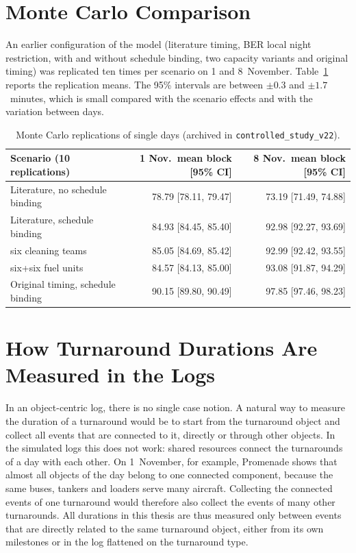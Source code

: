 \section{Monte Carlo Comparison}

An earlier configuration of the model (literature timing, BER local night restriction, with and without schedule binding, two capacity variants and original timing) was replicated ten times per scenario on 1 and 8~November. Table~\ref{tab:mc} reports the replication means. The 95\% intervals are between $\pm0.3$ and $\pm1.7$~minutes, which is small compared with the scenario effects and with the variation between days.

\begin{table}[htbp]\centering\small
\begin{tabular}{lrr}\hline
Scenario (10 replications) & 1 Nov.\ mean block [95\% CI] & 8 Nov.\ mean block [95\% CI]\\\hline
Literature, no schedule binding & 78.79 [78.11, 79.47] & 73.19 [71.49, 74.88]\\
Literature, schedule binding & 84.93 [84.45, 85.40] & 92.98 [92.27, 93.69]\\
\quad six cleaning teams & 85.05 [84.69, 85.42] & 92.99 [92.42, 93.55]\\
\quad six+six fuel units & 84.57 [84.13, 85.00] & 93.08 [91.87, 94.29]\\
Original timing, schedule binding & 90.15 [89.80, 90.49] & 97.85 [97.46, 98.23]\\\hline
\end{tabular}
\caption{Monte Carlo replications of single days (archived in \texttt{controlled\_study\_v22}).}
\label{tab:mc}
\end{table}

\section{How Turnaround Durations Are Measured in the Logs}

In an object-centric log, there is no single case notion. A natural way to measure the duration of a turnaround would be to start from the turnaround object and collect all events that are connected to it, directly or through other objects. In the simulated logs this does not work: shared resources connect the turnarounds of a day with each other. On 1~November, for example, Promenade shows that almost all objects of the day belong to one connected component, because the same buses, tankers and loaders serve many aircraft. Collecting the connected events of one turnaround would therefore also collect the events of many other turnarounds. All durations in this thesis are thus measured only between events that are directly related to the same turnaround object, either from its own milestones or in the log flattened on the turnaround type.
